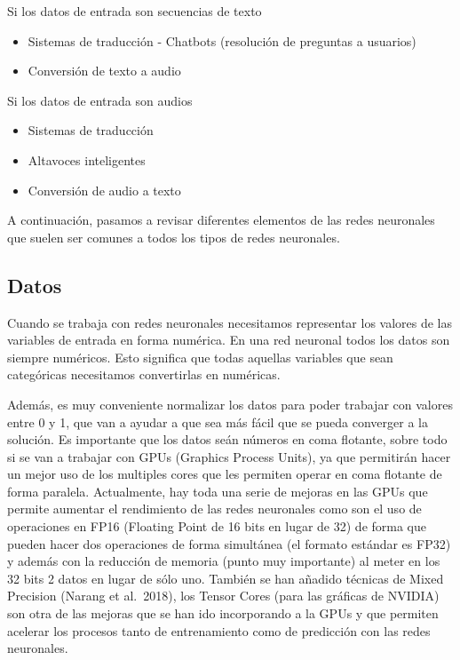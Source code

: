 \documentclass[
  a4paper,
  DIV=11,
  numbers=noendperiod]{scrreprt}
\begin{document}
Si los datos de entrada son secuencias de texto

\begin{itemize}
\item
  Sistemas de traducción - Chatbots (resolución de preguntas a usuarios)
\item
  Conversión de texto a audio
\end{itemize}

Si los datos de entrada son audios

\begin{itemize}
\item
  Sistemas de traducción
\item
  Altavoces inteligentes
\item
  Conversión de audio a texto
\end{itemize}

A continuación, pasamos a revisar diferentes elementos de las redes
neuronales que suelen ser comunes a todos los tipos de redes neuronales.

\subsection{Datos}\label{datos}

Cuando se trabaja con redes neuronales necesitamos representar los
valores de las variables de entrada en forma numérica. En una red
neuronal todos los datos son siempre numéricos. Esto significa que todas
aquellas variables que sean categóricas necesitamos convertirlas en
numéricas.

Además, es muy conveniente normalizar los datos para poder trabajar con
valores entre 0 y 1, que van a ayudar a que sea más fácil que se pueda
converger a la solución. Es importante que los datos seán números en
coma flotante, sobre todo si se van a trabajar con GPUs (Graphics
Process Units), ya que permitirán hacer un mejor uso de los multiples
cores que les permiten operar en coma flotante de forma paralela.
Actualmente, hay toda una serie de mejoras en las GPUs que permite
aumentar el rendimiento de las redes neuronales como son el uso de
operaciones en FP16 (Floating Point de 16 bits en lugar de 32) de forma
que pueden hacer dos operaciones de forma simultánea (el formato
estándar es FP32) y además con la reducción de memoria (punto muy
importante) al meter en los 32 bits 2 datos en lugar de sólo uno.
También se han añadido técnicas de Mixed Precision (Narang et al.~2018),
los Tensor Cores (para las gráficas de NVIDIA) son otra de las mejoras
que se han ido incorporando a la GPUs y que permiten acelerar los
procesos tanto de entrenamiento como de predicción con las redes
neuronales.
\end{document}
